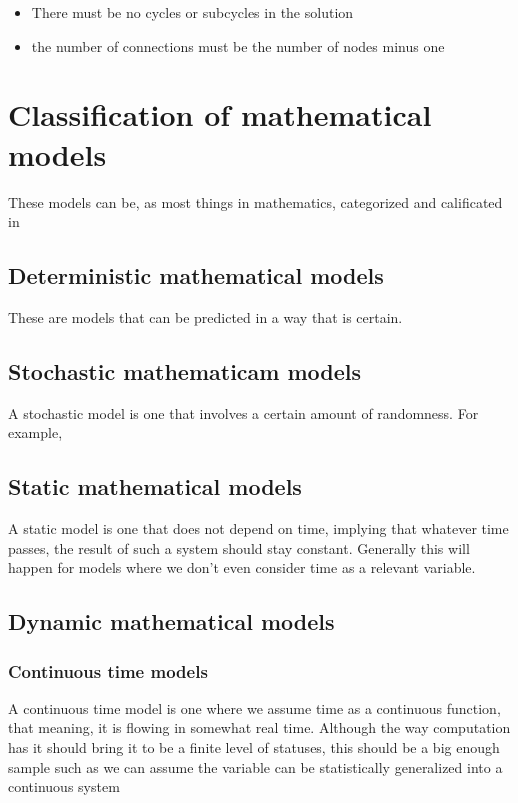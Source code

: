 \documentclass{textbook}
\begin{document}
\begin{itemize}
    \item There must be no cycles or subcycles in the solution
    \item the number of connections must be the number of nodes minus one
\end{itemize}

\section{Classification of mathematical models}

These models can be, as most things in mathematics, categorized and calificated in 

\subsection{Deterministic mathematical models}

These are models that can be predicted in a way that is certain.

\subsection{Stochastic mathematicam models}

A stochastic model is one that involves a certain amount of randomness. For example, 

\subsection{Static mathematical models}

A static model is one that does not depend on time, implying that whatever time passes, the result of
such a system should stay constant. Generally this will happen for models where we don't even consider time as a 
relevant variable.

\subsection{Dynamic mathematical models}
\subsubsection{Continuous time models}

A continuous time model is one where we assume time as a continuous function, that meaning, it is
flowing in somewhat real time. Although the way computation has it should bring it to be a finite level of
statuses, this should be a big enough sample such as we can assume the variable can be statistically generalized into
a continuous system
\end{document}
